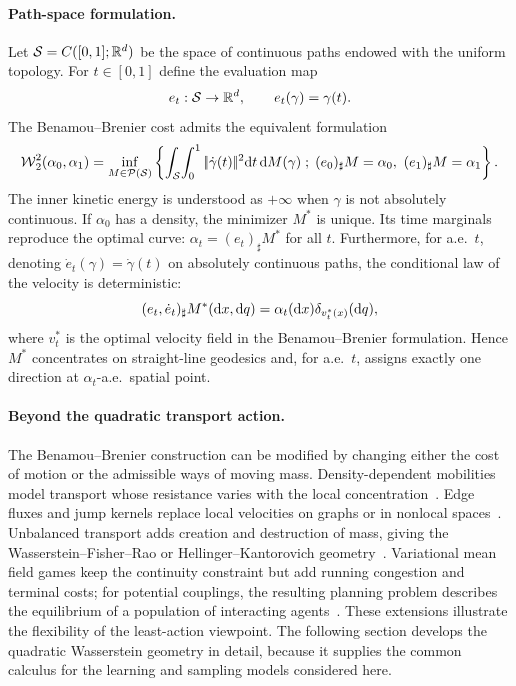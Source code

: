 \paragraph{Path-space formulation.}\label{rem-bb-path-space}
	Let $\mathcal{S}=C([0,1];\mathbb{R}^d)$ be the space of continuous paths endowed with the uniform topology. For $t\in[0,1]$ define the evaluation map
	\[
		e_t:\mathcal{S}\to\mathbb{R}^d,
		\qquad
		e_t(\gamma)=\gamma(t).
	\]
	The Benamou--Brenier cost admits the equivalent formulation
	\[
		\operatorname{\mathcal{W}}_2^2(\alpha_0,\alpha_1)
		=
		\inf_{M\in\mathcal{P}(\mathcal{S})}
		\left\{ 
			\int_{\mathcal{S}}\!\int_0^1|\!| \dot\gamma(t) |\!|^2\mathrm{d} t\,\mathrm{d} M(\gamma)
		 \;;\; 
			(e_0)_\sharp M=\alpha_0,\ (e_1)_\sharp M=\alpha_1
		 \right\}.
	\]
	The inner kinetic energy is understood as $+\infty$ when $\gamma$ is not absolutely continuous. If $\alpha_0$ has a density, the minimizer $M^*$ is unique. Its time marginals reproduce the optimal curve: $\alpha_t=(e_t)_\sharp M^*$ for all $t$. Furthermore, for a.e.\ $t$, denoting $\dot e_t(\gamma)=\dot\gamma(t)$ on absolutely continuous paths, the conditional law of the velocity is deterministic:
	\[
		(e_t,\dot e_t)_\sharp M^*(\mathrm{d} x,\mathrm{d} q)
		=
		\alpha_t(\mathrm{d} x)\delta_{v_t^*(x)}(\mathrm{d} q),
	\]
	where $v_t^*$ is the optimal velocity field in the Benamou--Brenier formulation. Hence $M^*$ concentrates on straight-line geodesics and, for a.e.\ $t$, assigns exactly one direction at $\alpha_t$-a.e.\ spatial point.


\paragraph{Beyond the quadratic transport action.}\label{par-generalized-dynamic-perspectives}
The Benamou--Brenier construction can be modified by changing either the cost of motion or the admissible ways of moving mass. Density-dependent mobilities model transport whose resistance varies with the local concentration~\citep{dolbeault2009new}. Edge fluxes and jump kernels replace local velocities on graphs or in nonlocal spaces~\citep{Maas2011,MielkeCVPDE,Erbar2012JumpEntropy}. Unbalanced transport adds creation and destruction of mass, giving the Wasserstein--Fisher--Rao or Hellinger--Kantorovich geometry~\citep{LieroMielkeSavareLong,2017-chizat-focm}. Variational mean field games keep the continuity constraint but add running congestion and terminal costs; for potential couplings, the resulting planning problem describes the equilibrium of a population of interacting agents~\citep{LasryLions2007MeanFieldGames,BenamouCarlierSantambrogio2017}. These extensions illustrate the flexibility of the least-action viewpoint. The following section develops the quadratic Wasserstein geometry in detail, because it supplies the common calculus for the learning and sampling models considered here.

\FloatBarrier
